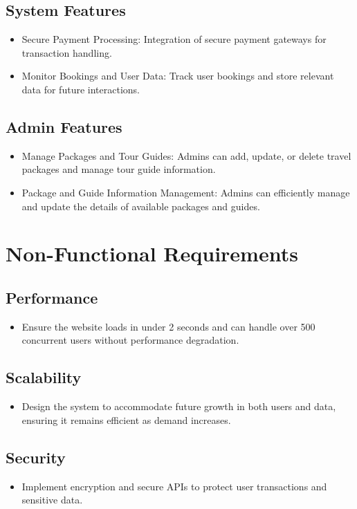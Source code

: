 \documentclass[12pt]{scrreprt}
\begin{document}
\subsection{System Features}
\begin{itemize}
    \item Secure Payment Processing: Integration of secure payment gateways for transaction handling.
    \item Monitor Bookings and User Data: Track user bookings and store relevant data for future interactions.
\end{itemize}

\subsection{Admin Features}
\begin{itemize}
    \item Manage Packages and Tour Guides: Admins can add, update, or delete travel packages and manage tour guide information.
    \item Package and Guide Information Management: Admins can efficiently manage and update the details of available packages and guides.
\end{itemize}

\section{Non-Functional Requirements}
\subsection{Performance}
\begin{itemize}
    \item Ensure the website loads in under 2 seconds and can handle over 500 concurrent users without performance degradation.
\end{itemize}

\subsection{Scalability}
\begin{itemize}
    \item Design the system to accommodate future growth in both users and data, ensuring it remains efficient as demand increases.
\end{itemize}

\subsection{Security}
\begin{itemize}
    \item Implement encryption and secure APIs to protect user transactions and sensitive data.
\end{itemize}
\end{document}
